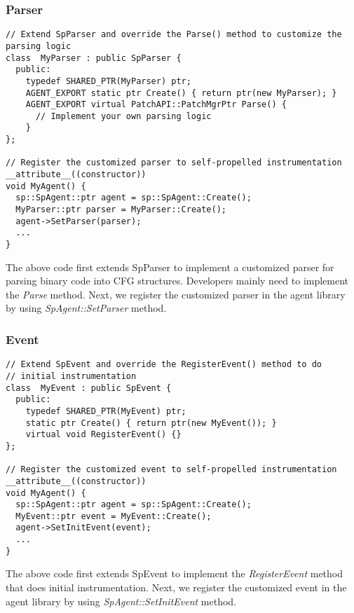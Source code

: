 \subsubsection{Parser}
\lstset{numbers=left}
\begin{lstlisting}[caption=Use customized parser]
// Extend SpParser and override the Parse() method to customize the parsing logic
class  MyParser : public SpParser {
  public:
    typedef SHARED_PTR(MyParser) ptr;
    AGENT_EXPORT static ptr Create() { return ptr(new MyParser); }
    AGENT_EXPORT virtual PatchAPI::PatchMgrPtr Parse() {
      // Implement your own parsing logic
    }
};

// Register the customized parser to self-propelled instrumentation
__attribute__((constructor))
void MyAgent() {
  sp::SpAgent::ptr agent = sp::SpAgent::Create();
  MyParser::ptr parser = MyParser::Create();
  agent->SetParser(parser);
  ...
}
\end{lstlisting}
The above code first extends SpParser to implement a customized parser for
parsing binary code into CFG structures. Developers mainly need to implement the
{\em Parse} method. Next, we register the customized parser in the agent library
by using {\em SpAgent::SetParser} method.

\subsubsection{Event}
\lstset{numbers=left}
\begin{lstlisting}[caption=Use customized event]
// Extend SpEvent and override the RegisterEvent() method to do 
// initial instrumentation
class  MyEvent : public SpEvent {
  public:
    typedef SHARED_PTR(MyEvent) ptr;
    static ptr Create() { return ptr(new MyEvent()); }
    virtual void RegisterEvent() {}
};

// Register the customized event to self-propelled instrumentation
__attribute__((constructor))
void MyAgent() {
  sp::SpAgent::ptr agent = sp::SpAgent::Create();
  MyEvent::ptr event = MyEvent::Create();
  agent->SetInitEvent(event);
  ...
}
\end{lstlisting}
The above code first extends SpEvent to implement the {\em RegisterEvent} method
that does initial instrumentation. Next, we register the customized event in
the agent library by using {\em SpAgent::SetInitEvent} method.

